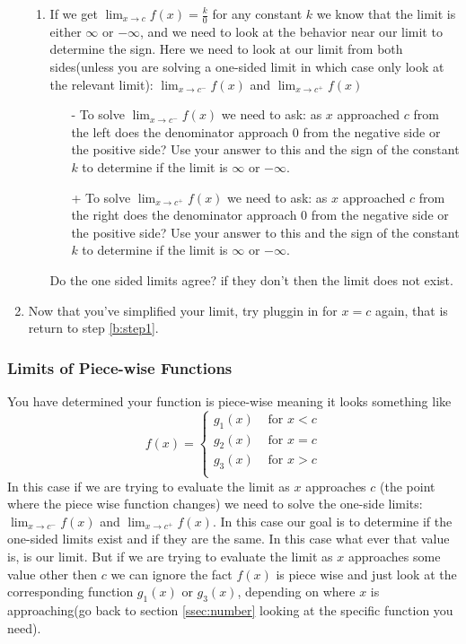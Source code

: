 \documentclass[12pt]{article}
\begin{document}
\begin{enumerate}
\begin{enumerate}[label=\alph*.]
        \item\label{b:kz} If we get $\displaystyle{\lim_{x\to c}f(x)}=\frac{k}{0}$ for any constant $k$ we know that the limit is either $\infty$ or $-\infty$, and we need to look at the behavior near our limit to determine the sign. Here we need to look at our limit from both sides(unless you are solving a one-sided limit in which case only look at the relevant limit): $\displaystyle{\lim_{x\to c^-}f(x)}$ and $\displaystyle{\lim_{x\to c^+}f(x)}$ \\
        \begin{itemize}
            \item[-] To solve $\displaystyle{\lim_{x\to c^-}f(x)}$ we need to ask: as $x$ approached $c$ from the left does the denominator approach $0$ from the negative side or the positive side? Use your answer to this and the sign of the constant $k$ to determine if the limit is $\infty$ or $-\infty$.\\
            \item[+] To solve $\displaystyle{\lim_{x\to c^+}f(x)}$ we need to ask: as $x$ approached $c$ from the right does the denominator approach $0$ from the negative side or the positive side? Use your answer to this and the sign of the constant $k$ to determine if the limit is $\infty$ or $-\infty$.\\
        \end{itemize}
    Do the one sided limits agree? if they don't then the limit does not exist.
    \end{enumerate}
\item \label{b:step2}
Now that you've simplified your limit, try pluggin in for $x=c$ again, that is return to step \ref{b:step1}.
    
\end{enumerate}


\subsubsection{Limits of Piece-wise Functions}
\label{ssec:pw-number}
 You have determined your function is piece-wise meaning it looks something like 
 $$f(x)=\begin{cases}
     g_1(x) & \text{ for } x<c\\
     g_2(x) & \text{ for } x=c\\
     g_3(x) & \text{ for } x>c\\
 \end{cases}$$
In this case if we are trying to evaluate the limit as $x$ approaches $c$ (the point where the piece wise function changes) we need to solve the one-side limits: $\displaystyle{\lim_{x\to c^-}f(x)}$ and $\displaystyle{\lim_{x\to c^+}f(x)}$. In this case our goal is to determine if the one-sided limits exist and if they are the same. In this case what ever that value is, is our limit. But if we are trying to evaluate the limit as $x$ approaches some value other then $c$ we can ignore the fact $f(x)$ is piece wise and just look at the corresponding function $g_1(x)$ or $g_3(x)$, depending on where $x$ is approaching(go back to section \ref{ssec:number} looking at the specific function you need).\\
\end{document}
